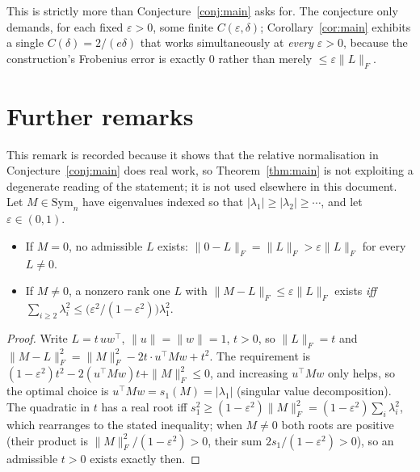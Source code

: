 \documentclass{aicr-solution}
\newcommand{\Sym}[1]{\mathrm{Sym}_{#1}}
\begin{document}
\noindent This is strictly more than Conjecture~\ref{conj:main} asks
for. The conjecture only demands, for each fixed $\varepsilon>0$, some
finite $C(\varepsilon,\delta)$; Corollary~\ref{cor:main} exhibits a
single $C(\delta) = 2/(e\delta)$ that works simultaneously at
\emph{every} $\varepsilon > 0$, because the construction's Frobenius
error is exactly $0$ rather than merely $\le \varepsilon\|L\|_{F}$.

\section{Further remarks}\label{sec:remarks}

\begin{remark}\label{rem:cancellation}
This remark is recorded because it shows that the relative
normalisation in Conjecture~\ref{conj:main} does real work, so
Theorem~\ref{thm:main} is not exploiting a degenerate reading of the
statement; it is not used elsewhere in this document. Let $M \in
\Sym{n}$ have eigenvalues indexed so that $|\lambda_{1}| \ge
|\lambda_{2}| \ge \cdots$, and let $\varepsilon \in (0,1)$.
\begin{itemize}
\item If $M = 0$, no admissible $L$ exists: $\|0-L\|_{F} =
  \|L\|_{F} > \varepsilon\|L\|_{F}$ for every $L \ne 0$.
\item If $M \ne 0$, a nonzero rank one $L$ with $\|M-L\|_{F} \le
  \varepsilon\|L\|_{F}$ exists \emph{iff} $\sum_{i\ge 2}\lambda_{i}^{2}
  \le \big(\varepsilon^{2}/(1-\varepsilon^{2})\big)\lambda_{1}^{2}$.
\end{itemize}
\end{remark}

\begin{proof}
Write $L = t\,uw^{\top}$, $\|u\| = \|w\| = 1$, $t > 0$, so $\|L\|_{F}
= t$ and $\|M-L\|_{F}^{2} = \|M\|_{F}^{2} - 2t\cdot u^{\top}Mw +
t^{2}$. The requirement is $(1-\varepsilon^{2})t^{2} -
2(u^{\top}Mw)t + \|M\|_{F}^{2} \le 0$, and increasing $u^{\top}Mw$
only helps, so the optimal choice is $u^{\top}Mw = s_{1}(M) =
|\lambda_{1}|$ (singular value decomposition). The quadratic in $t$
has a real root iff $s_{1}^{2} \ge (1-\varepsilon^{2})\|M\|_{F}^{2} =
(1-\varepsilon^{2})\sum_{i}\lambda_{i}^{2}$, which rearranges to the
stated inequality; when $M \ne 0$ both roots are positive (their
product is $\|M\|_{F}^{2}/(1-\varepsilon^{2}) > 0$, their sum
$2s_{1}/(1-\varepsilon^{2}) > 0$), so an admissible $t>0$ exists
exactly then.
\end{proof}
\end{document}
